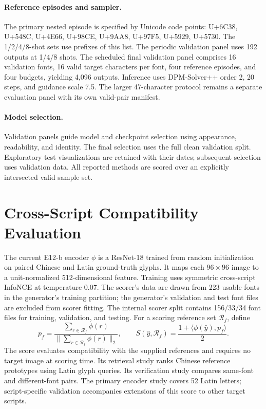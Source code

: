 \documentclass{article}
\newcommand{\Rset}{\mathcal R}
\begin{document}
\paragraph{Reference episodes and sampler.}
The primary nested episode is specified by Unicode code points:
U+6C38, U+548C, U+4E66, U+98CE, U+9AA8, U+97F5, U+5929, U+5730.
The 1/2/4/8-shot sets use prefixes of this list.
The periodic validation panel uses 192 outputs at 1/4/8 shots.
The scheduled final validation panel comprises 16 validation fonts, 16 valid target characters per font, four reference episodes, and four budgets, yielding 4,096 outputs.
Inference uses DPM-Solver++ order 2, 20 steps, and guidance scale 7.5.
The larger 47-character protocol remains a separate evaluation panel with its own valid-pair manifest.

\paragraph{Model selection.}
Validation panels guide model and checkpoint selection using appearance, readability, and identity.
The final selection uses the full clean validation split.
Exploratory test visualizations are retained with their dates; subsequent selection uses validation data.
All reported methods are scored over an explicitly intersected valid sample set.

\section{Cross-Script Compatibility Evaluation}
\label{app:evaluator}
The current E12-b encoder $\phi$ is a ResNet-18 trained from random initialization on paired Chinese and Latin ground-truth glyphs.
It maps each $96\times96$ image to a unit-normalized 512-dimensional feature.
Training uses symmetric cross-script InfoNCE at temperature 0.07.
The scorer's data are drawn from 223 usable fonts in the generator's training partition; the generator's validation and test font files are excluded from scorer fitting.
The internal scorer split contains 156/33/34 font files for training, validation, and testing.
For a scoring reference set $\Rset_f$, define
\begin{equation}
 p_f=\frac{\sum_{r\in\Rset_f}\phi(r)}{\|\sum_{r\in\Rset_f}\phi(r)\|_2},
 \qquad S(\hat y,\Rset_f)=\frac{1+\langle\phi(\hat y),p_f\rangle}{2}.
\end{equation}
The score evaluates compatibility with the supplied references and requires no target image at scoring time.
Its retrieval study ranks Chinese reference prototypes using Latin glyph queries.
Its verification study compares same-font and different-font pairs.
The primary encoder study covers 52 Latin letters; script-specific validation accompanies extensions of this score to other target scripts.
\end{document}
